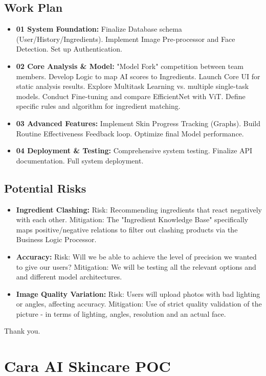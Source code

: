 \documentclass[12pt,a4paper]{article}
\begin{document}
\subsection{Work Plan}
\begin{itemize}
    \item \textbf{01 System Foundation:} Finalize Database schema (User/History/Ingredients). Implement Image Pre-processor and Face Detection. Set up Authentication.
    \item \textbf{02 Core Analysis \& Model:} "Model Fork" competition between team members. Develop Logic to map AI scores to Ingredients. Launch Core UI for static analysis results. Explore Multitask Learning vs. multiple single-task models. Conduct Fine-tuning and compare EfficientNet with ViT. Define specific rules and algorithm for ingredient matching.
    \item \textbf{03 Advanced Features:} Implement Skin Progress Tracking (Graphs). Build Routine Effectiveness Feedback loop. Optimize final Model performance.
    \item \textbf{04 Deployment \& Testing:} Comprehensive system testing. Finalize API documentation. Full system deployment.
\end{itemize}

\subsection{Potential Risks}
\begin{itemize}
    \item \textbf{Ingredient Clashing:} Risk: Recommending ingredients that react negatively with each other. Mitigation: The "Ingredient Knowledge Base" specifically maps positive/negative relations to filter out clashing products via the Business Logic Processor.
    \item \textbf{Accuracy:} Risk: Will we be able to achieve the level of precision we wanted to give our users? Mitigation: We will be testing all the relevant options and and different model architectures.
    \item \textbf{Image Quality Variation:} Risk: Users will upload photos with bad lighting or angles, affecting accuracy. Mitigation: Use of strict quality validation of the picture - in terms of lighting, angles, resolution and an actual face.
\end{itemize}
Thank you.

\newpage
\section{Cara AI Skincare POC}
\end{document}
